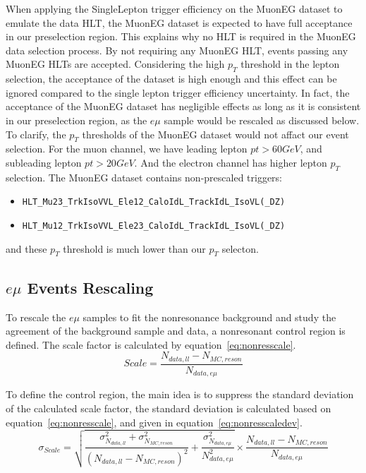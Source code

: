 \vspace{0.3cm}
When applying the SingleLepton trigger efficiency on the MuonEG dataset to emulate the data HLT, the MuonEG dataset is expected to have full acceptance in our preselection region. This explains why no HLT is required in the MuonEG data selection process. By not requiring any MuonEG HLT, events passing any MuonEG HLTs are accepted. Considering the high $p_T$ threshold in the lepton selection, the acceptance of the dataset is high enough and this effect can be ignored compared to the single lepton trigger efficiency uncertainty. In fact, the acceptance of the MuonEG dataset has negligible effects as long as it is consistent in our preselection region, as the $e\mu$ sample would be rescaled as discussed below. To clarify, the $p_T$ thresholds of the MuonEG dataset would not affact our event selection. For the muon channel, we have leading lepton $pt>60 GeV$, and subleading lepton $pt>20 GeV$. And the electron channel has higher lepton $p_T$ selection. The MuonEG dataset contains non-prescaled triggers:
\begin{itemize}
\item \texttt{HLT\_Mu23\_TrkIsoVVL\_Ele12\_CaloIdL\_TrackIdL\_IsoVL(\_DZ)} 
\item \texttt{HLT\_Mu12\_TrkIsoVVL\_Ele23\_CaloIdL\_TrackIdL\_IsoVL(\_DZ)}
\end{itemize}
and these $p_T$ threshold is much lower than our $p_T$ selecton.

\subsection{$e\mu$ Events Rescaling}
To rescale the $e\mu$ samples to fit the nonresonance background and study the agreement of the background sample and data, a nonresonant control region is defined. The scale factor is calculated by equation~\ref{eq:nonresscale}.
\begin{equation} \label{eq:nonresscale}
  Scale  =  \frac{N_{data,ll}-N_{MC,reson}}{N_{data,e\mu}}
\end{equation}

To define the control region, the main idea is to suppress the standard deviation of the calculated scale factor, the standard deviation is calculated based on equation~\ref{eq:nonresscale}, and given in equation~\ref{eq:nonresscaledev}.
\begin{equation} \label{eq:nonresscaledev}
  \sigma_{Scale}  = \sqrt{\frac{\sigma^{2}_{N_{data,ll}}+\sigma^{2}_{N_{MC,reson}}}{(N_{data,ll}-N_{MC,reson})^{2}}+\frac{\sigma^{2}_{N_{data,e\mu}}}{N^{2}_{data,e\mu}}}\times \frac{N_{data,ll}-N_{MC,reson}}{N_{data,e\mu}}
\end{equation}

